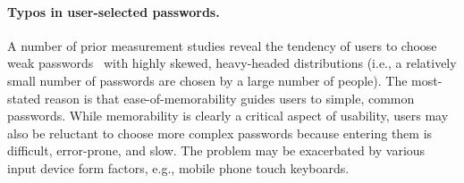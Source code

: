 

\paragraph{Typos in user-selected passwords.} A number of prior
measurement studies reveal the tendency of users to choose weak
passwords~\cite{bonneau2014towards,florencio2007lsw,Morris:1979:Password}
with highly skewed, heavy-headed distributions (i.e., a relatively
small number of passwords are chosen by a large number of people).
The most-stated reason is that ease-of-memorability guides users to
simple, common passwords.
While memorability is clearly a
critical aspect of usability, users may also be
reluctant to choose more complex passwords 
because entering them is difficult, error-prone, and slow. The problem may be
exacerbated by various input device form factors, e.g., mobile phone touch
keyboards.

